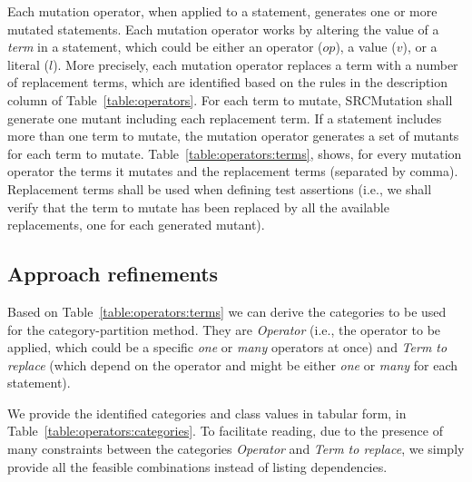 Each mutation operator, when applied to a statement, generates one or more mutated statements.
Each mutation operator works by altering the value of a \emph{term} in a statement, which could be either an operator  ($op$), a value ($v$), or a literal ($l$). More precisely, each mutation operator replaces a term with a number of replacement terms, which are identified based on the rules in the description column of Table~\ref{table:operators}.
For each term to mutate, SRCMutation shall generate one mutant including each replacement term.
If a statement includes more than one term to mutate, the mutation operator generates a set of mutants for each term to mutate. Table~\ref{table:operators:terms}, shows, for every mutation operator the terms it mutates and the replacement terms (separated by comma). Replacement terms shall be used when defining test assertions (i.e., we shall verify that the term to mutate has been replaced by all the available replacements, one for each generated mutant).




\clearpage

\subsection{Approach refinements}

Based on Table~\ref{table:operators:terms} we can derive the categories to be used for the category-partition method. 
They are \emph{Operator} (i.e., the operator to be applied, which could be a specific \emph{one} or \emph{many} operators at once) and \emph{Term to replace} (which depend on the operator and might be either \emph{one} or \emph{many} for each statement).

We provide the identified categories and class values in tabular form, in Table~\ref{table:operators:categories}. 
To facilitate reading, due to the presence of many constraints between the categories \emph{Operator} and \emph{Term to replace}, we simply provide all the feasible combinations instead of listing dependencies.

